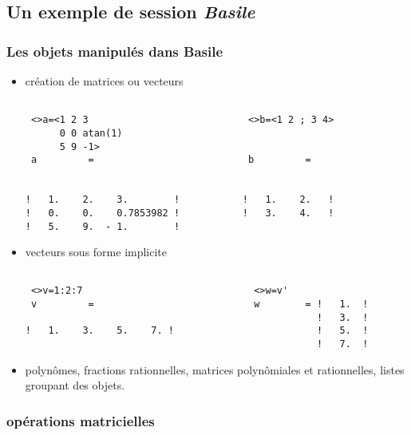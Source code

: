 \subsection{Un exemple de session {\em Basile}}

\subsubsection{Les objets manipul\'es dans {\bf Basile}} 

\begin{itemize}

\item cr\'eation de matrices ou vecteurs

\begin{verbatim}

 <>a=<1 2 3                            <>b=<1 2 ; 3 4>
      0 0 atan(1)                
      5 9 -1>       
 a         =                           b         =
 
   
!   1.    2.    3.        !           !   1.    2.   !
!   0.    0.    0.7853982 !           !   3.    4.   !
!   5.    9.  - 1.        ! 

\end{verbatim}


\item vecteurs sous forme implicite

\newpage

\begin{verbatim}
 
 <>v=1:2:7                              <>w=v'
 v         =                            w        = !   1.  !
                                                   !   3.  !
!   1.    3.    5.    7. !                         !   5.  !
                                                   !   7.  !

\end{verbatim}

\item polyn\^omes, fractions rationnelles, matrices
polyn\^omiales et rationnelles, listes groupant des objets.


\end{itemize}


\subsubsection{op\'erations matricielles}


